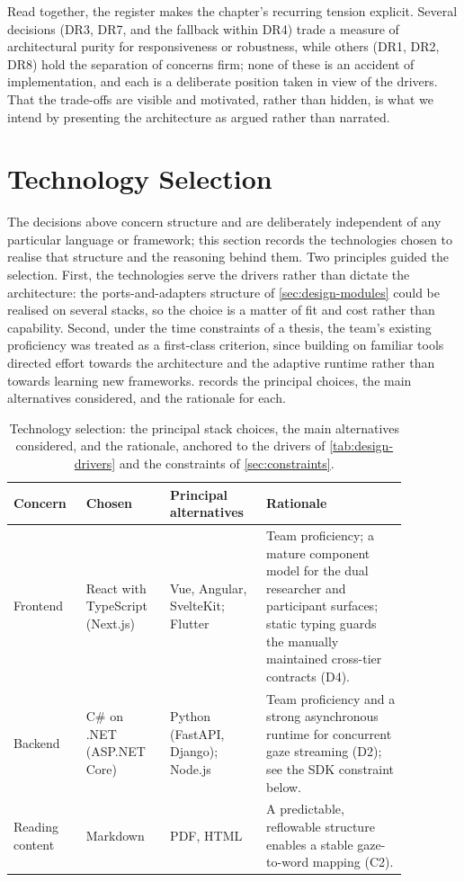 Read together, the register makes the chapter's recurring tension explicit.
Several decisions (DR3, DR7, and the fallback within DR4) trade a measure of architectural purity for responsiveness or robustness, while others (DR1, DR2, DR8) hold the separation of concerns firm; none of these is an accident of implementation, and each is a deliberate position taken in view of the drivers.
That the trade-offs are visible and motivated, rather than hidden, is what we intend by presenting the architecture as argued rather than narrated.

\section{Technology Selection}
\label{sec:technology-selection}
The decisions above concern structure and are deliberately independent of any particular language or framework; this section records the technologies chosen to realise that structure and the reasoning behind them.
Two principles guided the selection.
First, the technologies serve the drivers rather than dictate the architecture: the ports-and-adapters structure of \cref{sec:design-modules} could be realised on several stacks, so the choice is a matter of fit and cost rather than capability.
Second, under the time constraints of a thesis, the team's existing proficiency was treated as a first-class criterion, since building on familiar tools directed effort towards the architecture and the adaptive runtime rather than towards learning new frameworks.
 records the principal choices, the main alternatives considered, and the rationale for each.

\begin{table}[htbp]
\centering
\caption[Technology selection and rationale.]{Technology selection: the principal stack choices, the main alternatives considered, and the rationale, anchored to the drivers of \cref{tab:design-drivers} and the constraints of \cref{sec:constraints}.}
\label{tab:technology-selection}
\small
\setlength{\tabcolsep}{4pt}
\renewcommand{\arraystretch}{1.2}
\begin{tabular}{p{0.15\linewidth} p{0.19\linewidth} p{0.21\linewidth} p{0.32\linewidth}}
\toprule
\textbf{Concern} & \textbf{Chosen} & \textbf{Principal alternatives} & \textbf{Rationale} \\
\midrule
Frontend & React with TypeScript (Next.js) & Vue, Angular, SvelteKit; Flutter & Team proficiency; a mature component model for the dual researcher and participant surfaces; static typing guards the manually maintained cross-tier contracts (D4). \\
\addlinespace
Backend & C\# on .NET (ASP.NET Core) & Python (FastAPI, Django); Node.js & Team proficiency and a strong asynchronous runtime for concurrent gaze streaming (D2); see the SDK constraint below. \\
\addlinespace
Reading content & Markdown & PDF, HTML & A predictable, reflowable structure enables a stable gaze-to-word mapping (C2). \\
\bottomrule
\end{tabular}
\end{table}

